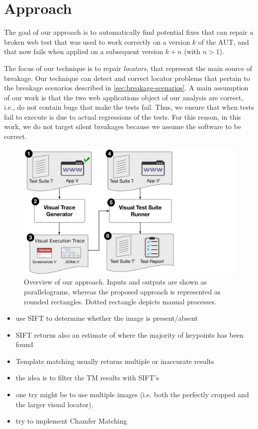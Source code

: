 \section{Approach}\label{sec:approach}

The goal of our approach is to automatically find potential fixes that can repair a broken web test that was used to work correctly on a  version $k$ of the AUT, and that now fails when applied on a subsequent version $k+n$ (with $n>1$).

The focus of our technique is to repair \textit{locators}, that represent the main source of breakage.
Our technique can detect and correct locator problems that pertain to the breakage scenarios described in \autoref{sec:breakage-scenarios}. A main assumption of our work is that the two web applications object of our analysis are correct, i.e., do not contain bugs that make the tests fail. Thus, we ensure that when tests fail to execute is due to actual regressions of the tests. For this reason, in this work, we do not target silent breakages because we assume the software to be correct.

\begin{figure}[t]
\centering
\includegraphics[trim={0.2cm 0cm 11cm 0.2cm},clip,scale=0.25]{images/approach-bigger}
\caption{Overview of our approach. Inputs and outputs are shown as parallelograms, whereas the proposed approach is represented as rounded rectangles. Dotted rectangle depicts manual processes.}
\label{approach}
\end{figure}

\begin{itemize}
\item use SIFT to determine whether the image is present/absent
\item SIFT returns also an estimate of where the majority of keypoints has been found
\item Template matching usually returns multiple or inaccurate results
\item the idea is to filter the TM results with SIFT's
\item one try might be to use multiple images (i.e. both the perfectly cropped and the larger visual locator).
\item try to implement Chamfer Matching
\end{itemize}

